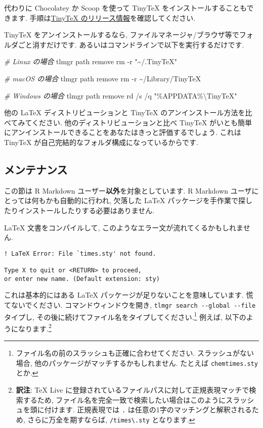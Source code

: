 \documentclass[
  xelatex,ja=standard,jafont=noto]{bxjsreport}
\newenvironment{Shaded}{\begin{snugshade}}{\end{snugshade}}
\newcommand{\AttributeTok}[1]{\textcolor[rgb]{0.77,0.63,0.00}{#1}}
\newcommand{\CommentTok}[1]{\textcolor[rgb]{0.56,0.35,0.01}{\textit{#1}}}
\newcommand{\ExtensionTok}[1]{#1}
\newcommand{\FunctionTok}[1]{\textcolor[rgb]{0.00,0.00,0.00}{#1}}
\newcommand{\NormalTok}[1]{#1}
\newcommand{\StringTok}[1]{\textcolor[rgb]{0.31,0.60,0.02}{#1}}
\begin{document}
代わりに Chocolatey か Scoop を使って TinyTeX
をインストールすることもできます.
手順は\href{https://github.com/yihui/tinytex-releases}{TinyTeX
のリリース情報}を確認してください.

TinyTeX をアンインストールするなら,
ファイルマネージャ/ブラウザ等でフォルダごと消すだけです.
あるいはコマンドラインで以下を実行するだけです.

\begin{Shaded}
\begin{Highlighting}[]
\CommentTok{\# Linux の場合}
\ExtensionTok{tlmgr}\NormalTok{ path remove}
\FunctionTok{rm} \AttributeTok{{-}r} \StringTok{"\textasciitilde{}/.TinyTeX"}

\CommentTok{\# macOS の場合}
\ExtensionTok{tlmgr}\NormalTok{ path remove}
\FunctionTok{rm} \AttributeTok{{-}r}\NormalTok{ \textasciitilde{}/Library/TinyTeX}

\CommentTok{\# Windows の場合}
\ExtensionTok{tlmgr}\NormalTok{ path remove}
\ExtensionTok{rd}\NormalTok{ /s /q }\StringTok{"\%APPDATA\%\textbackslash{}TinyTeX"}
\end{Highlighting}
\end{Shaded}

他の LaTeX ディストリビューションと TinyTeX
のアンインストール方法を比べてみてください.
他のディストリビューションと比べ TinyTeX
がいとも簡単にアンインストールできることをあなたはきっと評価するでしょう.
これは TinyTeX が自己完結的なフォルダ構成になっているからです.

\hypertarget{ux30e1ux30f3ux30c6ux30caux30f3ux30b9}{%
\subsection{メンテナンス}\label{ux30e1ux30f3ux30c6ux30caux30f3ux30b9}}

この節は R Markdown ユーザー\textbf{以外}を対象としています. R Markdown
ユーザにとっては何もかも自動的に行われ, 欠落した LaTeX
パッケージを手作業で探したりインストールしたりする必要はありません.

LaTeX 文書をコンパイルして,
このようなエラー文が流れてくるかもしれません.

\begin{verbatim}
! LaTeX Error: File `times.sty' not found.

Type X to quit or <RETURN> to proceed,
or enter new name. (Default extension: sty)
\end{verbatim}

これは基本的にはある LaTeX パッケージが足りないことを意味しています.
慌てないでください. コマンドウィンドウを開き,
\texttt{tlmgr\ search\ -\/-global\ -\/-file} タイプし,
その後に続けてファイル名をタイプしてください.\footnote{ファイル名の前のスラッシュも正確に合わせてください.
  スラッシュがない場合, 他のパッケージがマッチするかもしれません.
  たとえば \texttt{chemtimes.sty} とか.} 例えば,
以下のようになります.\footnote{\textbf{訳注}: TeX Live
  に登録されているファイルパスに対して正規表現マッチで検索するため,
  ファイル名を完全一致で検索したい場合はこのようにスラッシュを頭に付けます.
  正規表現では \texttt{.} は任意の1字のマッチングと解釈されるため,
  さらに万全を期すならば, \texttt{/times\textbackslash{}.sty}
  となります.}
\end{document}
